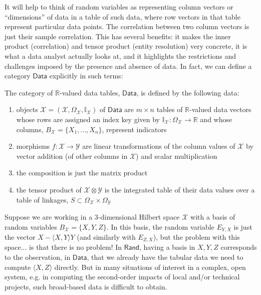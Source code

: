 \documentclass[sigconf]{acmart}
\let\olddagger\dagger
\renewcommand{\dagger}{\ensuremath{\olddagger}\xspace}
\newcommand{\Cat}[1]{\mathsf{#1}}
\def\Rand{\Cat{Rand}}
\def\Data{\Cat{Data}}
\begin{document}
It will help to think of random variables as representing column vectors or ``dimensions'' of data in a table of such data, where row vectors in that table represent particular data points. The correlation between two column vectors is just their sample correlation. This has several benefits: it makes the inner product (correlation) and tensor product (entity resolution) very concrete, it is what a data analyst actually looks at, and it highlights the restrictions and challenges imposed by the presence and absence of data. In fact, we can define a category $\Data$ explicitly in such terms:
\begin{definition}
The category of $\mathbb{R}$-valued data tables, $\Data$, is defined by the following data:
\begin{enumerate}
\item objects $\mathcal{X} = (\mathcal{X}, \Omega_\mathcal{X}, \mathbb{I}_\mathcal{X})$ of $\Data$ are $m \times n$ tables of $\mathbb{R}$-valued data vectors whose rows are assigned an index key given by $\mathbb{I}_\mathcal{X} : \Omega_\mathcal{X} \to \mathbb{R}$ and whose columns, $B_\mathcal{X} = \{X_1, ..., X_n\}$, represent indicators
\item morphisms $f: \mathcal{X} \to \mathcal{Y}$ are linear transformations of the column values of $\mathcal{X}$ by vector addition (of other columns in $\mathcal{X}$) and scalar multiplication
\item the composition is just the matrix product
\item the tensor product of $\mathcal{X} \otimes \mathcal{Y}$ is the integrated table of their data values over a table of linkages, $S \subset \Omega_\mathcal{X} \times \Omega_\mathcal{Y}$
\end{enumerate}
\end{definition}

Suppose we are working in a 3-dimensional Hilbert space $\mathcal{X}$ with a basis of random variables $B_\mathcal{X}=\{ X, Y, Z\}$. In this basis, the random variable $E_{Y,X}$ is just the vector $X - \langle X,Y \rangle Y$ (and similarly with $E_{Z,X}$), but the problem with this space... is that there is no problem! In $\Rand$, having a basis in $X,Y,Z$ corresponds to the observation, in $\Data$, that we already have the tabular data we need to compute $\langle X, Z \rangle$ directly. But in many situations of interest in a complex, open system, e.g. in computing the second-order impacts of local and/or technical projects, such broad-based data is difficult to obtain. 
\end{document}
